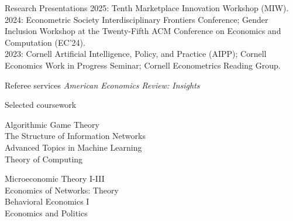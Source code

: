 \documentclass{resume} %
\newcommand{\itab}[1]{\hspace{0em}\rlap{#1}}
\begin{document}



\begin{rSection}{Research Presentations}
2025: Tenth Marketplace Innovation Workshop (MIW).
2024: Econometric Society Interdisciplinary Frontiers Conference; Gender Inclusion Workshop at the Twenty-Fifth ACM Conference on Economics and Computation (EC'24). \\
2023: Cornell Artificial Intelligence, Policy, and Practice (AIPP); Cornell Economics Work in Progress Seminar; Cornell Econometrics Reading Group. 
\end{rSection}


\begin{rSection}{Referee services}
\emph{American Economics Review: Insights}
\end{rSection}


\begin{rSection}{Selected coursework}
\begin{minipage}[t]{0.5\textwidth}
Algorithmic Game Theory \\
The Structure of Information Networks \\
Advanced Topics in Machine Learning \\
Theory of Computing
\end{minipage}
\begin{minipage}[t]{0.5\textwidth}
Microeconomic Theory I-III\\
Economics of Networks: Theory\\
Behavioral Economics I \\
Economics and Politics
\end{minipage}


\end{rSection}
\end{document}
